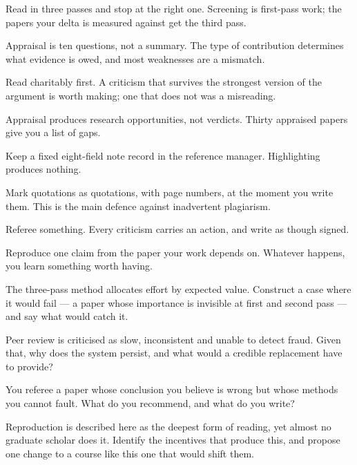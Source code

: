 \begin{chaptersummary}
\begin{tight}
  \item Read in three passes and stop at the right one. Screening is first-pass
    work; the papers your delta is measured against get the third pass.
  \item Appraisal is ten questions, not a summary. The type of contribution
    determines what evidence is owed, and most weaknesses are a mismatch.
  \item Read charitably first. A criticism that survives the strongest version
    of the argument is worth making; one that does not was a misreading.
  \item Appraisal produces research opportunities, not verdicts. Thirty
    appraised papers give you a list of gaps.
  \item Keep a fixed eight-field note record in the reference manager.
    Highlighting produces nothing.
  \item Mark quotations as quotations, with page numbers, at the moment you
    write them. This is the main defence against inadvertent plagiarism.
  \item Referee something. Every criticism carries an action, and write as
    though signed.
  \item Reproduce one claim from the paper your work depends on. Whatever
    happens, you learn something worth having.
\end{tight}
\end{chaptersummary}

\begin{reviewq}
  \item The three-pass method allocates effort by expected value. Construct a
    case where it would fail --- a paper whose importance is invisible at first
    and second pass --- and say what would catch it.
  \item Peer review is criticised as slow, inconsistent and unable to detect
    fraud. Given that, why does the system persist, and what would a credible
    replacement have to provide?
  \item You referee a paper whose conclusion you believe is wrong but whose
    methods you cannot fault. What do you recommend, and what do you write?
  \item Reproduction is described here as the deepest form of reading, yet
    almost no graduate scholar does it. Identify the incentives that produce
    this, and propose one change to a course like this one that would shift
    them.
\end{reviewq}

